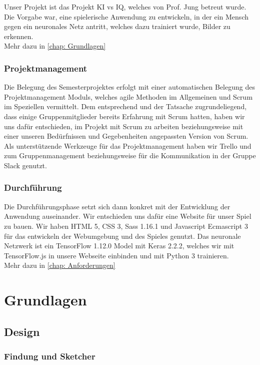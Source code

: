 \documentclass[11pt]{article}
\begin{document}
Unser Projekt ist das Projekt KI vs IQ, welches von Prof. Jung betreut wurde.
Die Vorgabe war, eine spielerische Anwendung zu entwickeln, in der ein Mensch gegen ein neuronales Netz antritt, welches dazu trainiert wurde, Bilder zu erkennen.\\
Mehr dazu in \autoref{chap: Grundlagen}
	
\subsubsection{  Projektmanagement }
\label{chap: Projektmanagement}
Die Belegung des Semesterprojektes erfolgt mit einer automatischen Belegung des Projektmanagement Moduls, welches agile Methoden im Allgemeinen und Scrum im Speziellen vermittelt. Dem entsprechend und der Tatsache zugrundeliegend, dass einige Gruppenmitglieder bereits Erfahrung mit Scrum hatten, haben wir uns dafür entschieden, im Projekt mit Scrum zu arbeiten beziehungsweise mit einer unseren Bedürfnissen und Gegebenheiten angepassten Version von Scrum.\\
Als unterstützende Werkzeuge für das Projektmanagement haben wir Trello und zum Gruppenmanagement beziehungsweise für die Kommunikation in der Gruppe Slack genutzt.

\subsubsection{ Durchführung }
\label{chap: durchfuhrung}
Die Durchführungsphase setzt sich dann konkret mit der Entwicklung der Anwendung auseinander. Wir entschieden uns dafür eine Website für unser Spiel zu bauen. Wir haben HTML 5, CSS 3, Sass 1.16.1 und Javascript Ecmascript 3 für das entwickeln der Webumgebung und des Spieles genutzt. Das neuronale Netzwerk ist ein TensorFlow 1.12.0 Model mit Keras 2.2.2, welches wir mit TensorFlow.js in unsere Webseite einbinden und mit Python 3 trainieren.\\
Mehr dazu in \autoref{chap: Anforderungen}

\section{Grundlagen}
\label{chap: Grundlagen}
\subsection{Design}
\subsubsection{Findung und Sketcher}
\end{document}
